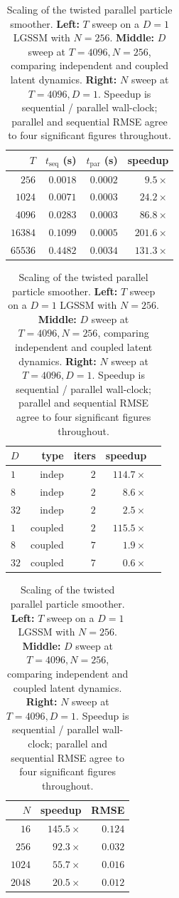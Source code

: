 \documentclass{article}
\begin{document}
\begin{table}[t]
\caption{Scaling of the twisted parallel particle smoother. \textbf{Left:} $T$ sweep on a $D=1$ LGSSM with $N=256$. \textbf{Middle:} $D$ sweep at $T=4096, N=256$, comparing independent and coupled latent dynamics. \textbf{Right:} $N$ sweep at $T=4096, D=1$. Speedup is sequential / parallel wall-clock; parallel and sequential RMSE agree to four significant figures throughout.}
\label{tab:scaling-T}
\centering
\small
\begin{tabular}{rrrr}
\toprule
$T$ & $t_{\text{seq}}$ (s) & $t_{\text{par}}$ (s) & speedup \\
\midrule
$256$    & $0.0018$ & $0.0002$ & $9.5\times$  \\
$1024$   & $0.0071$ & $0.0003$ & $24.2\times$ \\
$4096$   & $0.0283$ & $0.0003$ & $86.8\times$ \\
$16384$  & $0.1099$ & $0.0005$ & $\mathbf{201.6\times}$ \\
$65536$  & $0.4482$ & $0.0034$ & $131.3\times$ \\
\bottomrule
\end{tabular}
\quad
\begin{tabular}{lrrrr}
\toprule
$D$ & type & iters & speedup \\
\midrule
$1$  & indep   & $2$ & $114.7\times$ \\
$8$  & indep   & $2$ & $8.6\times$  \\
$32$ & indep   & $2$ & $2.5\times$  \\
$1$  & coupled & $2$ & $115.5\times$ \\
$8$  & coupled & $7$ & $1.9\times$  \\
$32$ & coupled & $7$ & $0.6\times$  \\
\bottomrule
\end{tabular}
\quad
\begin{tabular}{rrr}
\toprule
$N$ & speedup & RMSE \\
\midrule
$16$   & $145.5\times$ & $0.124$ \\
$256$  & $92.3\times$ & $0.032$ \\
$1024$ & $55.7\times$ & $0.016$ \\
$2048$ & $20.5\times$ & $0.012$ \\
\bottomrule
\end{tabular}
\end{table}
\end{document}
